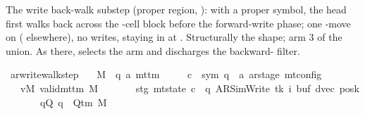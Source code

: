 \begin{isabellebody}
\isamarkupfalse%
%
\endisatagproof
{\isafoldproof}%
%
\isadelimproof
%
\endisadelimproof
%
\begin{isamarkuptext}%
The write back-walk substep (proper region,
  ): with  a proper symbol, the head
  first walks  back across the -cell block before the
  forward-write phase; one -move on  (
  elsewhere), no writes, staying in  at .
  Structurally the  shape; arm 3 of the
  union.  As there,  selects the arm and discharges
  the backward- filter.%
\end{isamarkuptext}\isamarkuptrue%
\isamarkupfalse%
\ ar{\isacharunderscore}{\kern0pt}write{\isacharunderscore}{\kern0pt}walk{\isacharunderscore}{\kern0pt}step{\isacharcolon}{\kern0pt}\isanewline
\ \ \ M\ {\isacharcolon}{\kern0pt}{\isacharcolon}{\kern0pt}\ {\isachardoublequoteopen}{\isacharparenleft}{\kern0pt}{\isacharprime}{\kern0pt}q{\isacharcomma}{\kern0pt}\ {\isacharprime}{\kern0pt}a{\isacharparenright}{\kern0pt}\ mttm{\isachardoublequoteclose}\isanewline
\ \ \ \ \ c{\isacharprime}{\kern0pt}\ {\isacharcolon}{\kern0pt}{\isacharcolon}{\kern0pt}\ {\isachardoublequoteopen}{\isacharparenleft}{\kern0pt}sym{}{\isacharcomma}{\kern0pt}\ {\isacharprime}{\kern0pt}q\ {\isasymtimes}\ {\isacharprime}{\kern0pt}a\ ar{\isacharunderscore}{\kern0pt}stage{\isacharparenright}{\kern0pt}\ mt{\isacharunderscore}{\kern0pt}config{\isachardoublequoteclose}\isanewline
\ \ \ vM{\isacharcolon}{\kern0pt}\ {\isachardoublequoteopen}valid{\isacharunderscore}{\kern0pt}mttm\ M{\isachardoublequoteclose}\isanewline
\ \ \ \ \ \ \ stg{\isacharcolon}{\kern0pt}\ {\isachardoublequoteopen}mt{\isacharunderscore}{\kern0pt}state\ c{\isacharprime}{\kern0pt}\ {\isacharequal}{\kern0pt}\ {\isacharparenleft}{\kern0pt}q{\isacharcomma}{\kern0pt}\ AR{\isacharunderscore}{\kern0pt}SimWrite{\isacharcomma}{\kern0pt}\ tk{\isacharcomma}{\kern0pt}\ i{\isacharcomma}{\kern0pt}\ buf{\isacharcomma}{\kern0pt}\ dvec{\isacharcomma}{\kern0pt}\ posk{\isacharparenright}{\kern0pt}{\isachardoublequoteclose}\isanewline
\ \ \ \ \ \ \ qQ{\isacharcolon}{\kern0pt}\ {\isachardoublequoteopen}q\ {\isasymin}\ Q{\isacharunderscore}{\kern0pt}tm\ M{\isachardoublequoteclose}\isanewline

\end{isabellebody}

